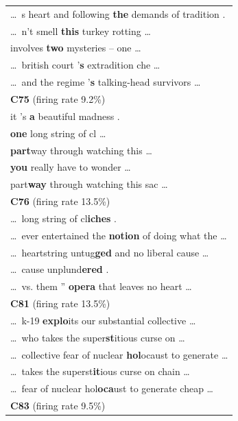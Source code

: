 \begin{longtable}{@{}>{\ttfamily}p{\linewidth}@{}}
    {\normalfont\textbf{C72} \hfill (firing rate 9.6\%)}\\
    \cmidrule(){1-1}
    \dots\ s heart and following\textbf{ the} demands of tradition .\\
    \dots\ n't smell\textbf{ this} turkey rotting \dots\\
    involves\textbf{ two} mysteries -- one \dots\\
    \dots\ british court '\textbf{s} extradition che \dots\\
    \dots\ and the regime '\textbf{s} talking-head survivors \dots\\
    \addlinespace
    {\normalfont\textbf{C75} \hfill (firing rate 9.2\%)}\\
    \cmidrule(){1-1}
    it 's\textbf{ a} beautiful madness .\\
    \textbf{one} long string of cl \dots\\
    \textbf{part}way through watching this \dots\\
    \textbf{you} really have to wonder \dots\\
    part\textbf{way} through watching this sac \dots\\
    \addlinespace
    {\normalfont\textbf{C76} \hfill (firing rate 13.5\%)}\\
    \cmidrule(){1-1}
    \dots\ long string of cl\textbf{iches} .\\
    \dots\ ever entertained the\textbf{ notion} of doing what the \dots\\
    \dots\ heartstring untug\textbf{ged} and no liberal cause \dots\\
    \dots\ cause unplund\textbf{ered} .\\
    \dots\ vs. them ''\textbf{ opera} that leaves no heart \dots\\
    \addlinespace
    {\normalfont\textbf{C81} \hfill (firing rate 13.5\%)}\\
    \cmidrule(){1-1}
    \dots\ k-19\textbf{ explo}its our substantial collective \dots\\
    \dots\ who takes the super\textbf{st}itious curse on \dots\\
    \dots\ collective fear of nuclear\textbf{ hol}ocaust to generate \dots\\
    \dots\ takes the superst\textbf{it}ious curse on chain \dots\\
    \dots\ fear of nuclear hol\textbf{oca}ust to generate cheap \dots\\
    \addlinespace
    {\normalfont\textbf{C83} \hfill (firing rate 9.5\%)}\\

\end{longtable}
